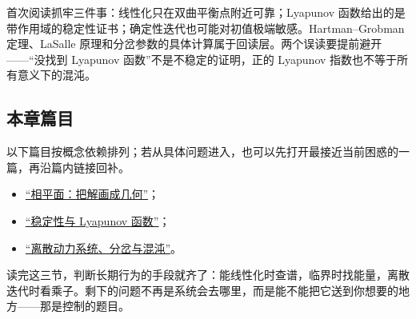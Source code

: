 首次阅读抓牢三件事：线性化只在双曲平衡点附近可靠；Lyapunov 函数给出的是带作用域的稳定性证书；确定性迭代也可能对初值极端敏感。Hartman--Grobman 定理、LaSalle 原理和分岔参数的具体计算属于回读层。两个误读要提前避开——``没找到 Lyapunov 函数''不是不稳定的证明，正的 Lyapunov 指数也不等于所有意义下的混沌。

\subsection{本章篇目}

以下篇目按概念依赖排列；若从具体问题进入，也可以先打开最接近当前困惑的一篇，再沿篇内链接回补。

\begin{itemize}
\tightlist
\item \hyperref[sec:15-Differential-Equations-and-Dynamical-Systems/02-Stability-and-Dynamical-Systems/01]{``相平面：把解画成几何''}；
\item \hyperref[sec:15-Differential-Equations-and-Dynamical-Systems/02-Stability-and-Dynamical-Systems/02]{``稳定性与 Lyapunov 函数''}；
\item \hyperref[sec:15-Differential-Equations-and-Dynamical-Systems/02-Stability-and-Dynamical-Systems/03]{``离散动力系统、分岔与混沌''}。
\end{itemize}

读完这三节，判断长期行为的手段就齐了：能线性化时查谱，临界时找能量，离散迭代时看乘子。剩下的问题不再是系统会去哪里，而是能不能把它送到你想要的地方——那是控制的题目。

